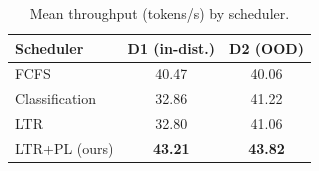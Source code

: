\begin{table}[t]
    \centering
    \small
    \caption{Mean throughput (tokens/s) by scheduler.}
    \label{tab:throughput}
    \begin{tabular}{@{}lcc@{}}
        \toprule
        Scheduler & D1 (in-dist.) & D2 (OOD) \\
        \midrule
        FCFS                & 40.47 & 40.06 \\
        Classification      & 32.86 & 41.22 \\
        LTR                 & 32.80 & 41.06 \\
        LTR+PL (ours)       & \textbf{43.21} & \textbf{43.82} \\
        \bottomrule
    \end{tabular}
\end{table}
